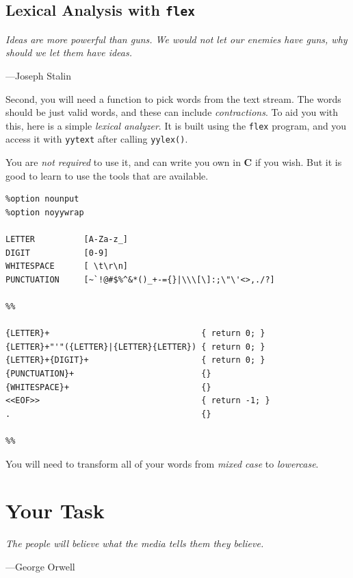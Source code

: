 \documentclass{article}
\begin{document}
\subsection{Lexical Analysis with \texttt{flex}}
\epigraph{\emph{Ideas are more powerful than guns. We would not let our enemies
have guns, why should we let them have ideas.}}{---Joseph Stalin}

\noindent
Second, you will need a function to pick words from the text stream.  The words
should be just valid words, and these can include \emph{contractions}. To aid
you with this, here is a simple \emph{lexical analyzer}. It is built using the
\texttt{flex} program, and you access it with \texttt{yytext} after calling
\texttt{yylex()}.

You are \emph{not required} to use it, and can write you own in \textbf{C} if
you wish. But it is good to learn to use the tools that are available.

\begin{lstlisting}[title=words.l]
%option noinput
%option nounput
%option noyywrap

LETTER          [A-Za-z_]
DIGIT           [0-9]
WHITESPACE      [ \t\r\n]
PUNCTUATION     [~`!@#$%^&*()_+-={}|\\\[\]:;\"\'<>,./?]

%%

{LETTER}+                               { return 0; }
{LETTER}+"'"({LETTER}|{LETTER}{LETTER}) { return 0; }
{LETTER}+{DIGIT}+                       { return 0; }
{PUNCTUATION}+                          {}
{WHITESPACE}+                           {}
<<EOF>>                                 { return -1; }
.                                       {}

%%
\end{lstlisting}

You will need to transform all of your words from \emph{mixed case} to
\emph{lowercase}.

\section{Your Task}
\epigraph{\emph{The people will believe what the media tells them they
believe.}}{---George Orwell}
\end{document}
